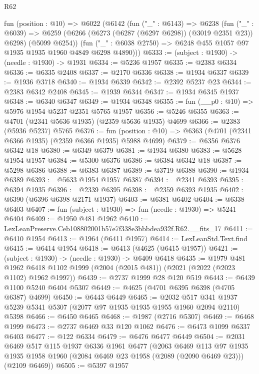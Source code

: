 \begin{lexlean}{R62}
\begin{coremodule}
  fun (position : @10) =>
  @6022
    (@6142
      (fun ("_" : @6143) =>
      @6238
        (fun ("_" : @6039) =>
        @6259 (@6266 (@6273 (@6287 (@6297 @6298)) (@3019 @2351 @23)) @6298) (@5099 @6254))
        (fun ("_" : @6038 @2750) => @6248 @455 @1057 @97 @1935 @1935 @1960 @4849 @6298 @4890)))
@6333 := (subject : @1930) -> (needle : @1930) -> @1931
@6334 := @5236 @1957
@6335 := @2383 @6334
@6336 := @6335 @2408
@6337 := @2170 @6336
@6338 := @1934 @6337
@6339 := @1936 @3718
@6340 := @1934 @6339
@6342 := @2392 @5237 @23
@6344 := @2383 @6342 @2408
@6345 := @1939 @6344
@6347 := @1934 @6345 @1937
@6348 := @6340 @6347
@6349 := @1934 @6348
@6355 := fun (__p0 : @10) => @5976 @1954 @5237 @2351 @5765 @1957
@6356 := @5246 @6355
@6363 := @4701 (@2341 @5636 @1935) (@2359 @5636 @1935) @4699
@6366 := @2383 (@5936 @5237) @5765
@6376 := fun (position : @10) => @6363 (@4701 (@2341 @6366 @1935) (@2359 @6366 @1935) @5988 @4699)
@6379 := @6356 @6376 @6342 @18
@6380 := @6349 @6379
@6381 := @1934 @6380
@6383 := @5628 @1954 @1957
@6384 := @5300 @6376
@6386 := @6384 @6342 @18
@6387 := @5298 @6386
@6388 := @6383 @6387
@6389 := @3719 @6388
@6390 := @1934 @6389
@6393 := @5633 @1954 @1957 @6387
@6394 := @2341 @6393
@6395 := @6394 @1935
@6396 := @2339 @6395
@6398 := @2359 @6393 @1935
@6402 := @6390 (@6396 @6398 @2171 @1937)
@6403 := @6381 @6402
@6404 := @6338 @6403
@6407 := fun (subject : @1930) => fun (needle : @1930) => @5241 @6404
@6409 := @1950 @481 @1962
@6410 := LexLeanPreserve.Ceb108802001b57e7f338e3bbbdea932f.R62.__fits_17
@6411 := @6410 @1954
@6413 := @1964 (@6411 @1957)
@6414 := LexLeanStd.Text.find
@6415 := @6414 @1954
@6418 := @6413 (@4625 (@6415 @1957))
@6421 := (subject : @1930) -> (needle : @1930) -> @6409 @6418
@6435 := @1979
    @481
    @1962
    @6418
    @1102
    @1999
    (@2004 (@2015 @481))
    (@2021 (@2022 (@2023 @1102) @1962 @1997))
@6439 := @2737 @1999 @28 @120 @519
@6443 := @6439 @1100 @5240 @6404 @5307
@6449 := @4625 (@4701 @6395 @6398 (@4705 @6387) @4699)
@6450 := @6443 @6449
@6465 := @2032
    @517
    @341
    @1937
    @5239
    @5341
    @5307
    (@2077 @97 @1935 @1935 @1955 @1960 @2094 @2110)
    @5398
@6466 := @6450 @6465
@6468 := @1987 (@2716 @5307)
@6469 := @6468 @1999
@6473 := @2737 @6469 @33 @120 @1062
@6476 := @6473 @1099 @6337 @6403
@6477 := @122 @6334
@6479 := @6476 @6477 @6449
@6504 := @2031
    @6469
    @517
    @115
    @1937
    @6336
    @1961
    @6477
    (@2063
      @6469
      @113
      @97
      @1935
      @1935
      @1958
      @1960
      (@2084 @6469 @23 @1958 (@2089 (@2090 @6469 @23)))
      (@2109 @6469))
@6505 := @5397 @1957

\end{coremodule}
\end{lexlean}
